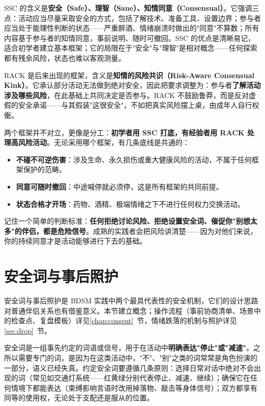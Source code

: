 \documentclass[12pt,UTF8]{ctexbook}
\newcommand{\keyword}[1]{\textbf{#1}}
\begin{document}
SSC 的含义是\keyword{安全（Safe）、理智（Sane）、知情同意（Consensual）}。它强调三点：活动应当尽量采取安全的方式，包括了解技术、准备工具、设置边界；参与者应当处于能理性判断的状态——严重醉酒、情绪崩溃时做出的"同意"不算数；所有内容基于参与者的知情同意，事前说明、随时可撤回。SSC 的优点是清晰易记，适合初学者建立基本框架；它的局限在于"安全"与"理智"是相对概念——任何探索都有残余风险，状态也难以客观测量。

RACK 是后来出现的框架，含义是\keyword{知情的风险共识（Risk-Aware Consensual Kink）}。它承认部分活动无法做到绝对安全，因此把要求调整为：参与者\keyword{了解活动涉及哪些风险}，在此基础上共同决定是否参与。RACK 不鼓励鲁莽，而是反对虚假的安全承诺——与其假装"这很安全"，不如把真实风险摆上桌，由成年人自行权衡。

两个框架并不对立，更像是分工：\keyword{初学者用 SSC 打底，有经验者用 RACK 处理高风险活动}。无论采用哪个框架，有几条底线是共通的：

\begin{itemize}
  \item \keyword{不碰不可逆伤害}：涉及生命、永久损伤或重大健康风险的活动，不属于任何框架保护的范畴。
  \item \keyword{同意可随时撤回}：中途喊停就必须停，这是所有框架的共同前提。
  \item \keyword{状态合格才开场}：药物、酒精、极端情绪之下不进行任何权力交换活动。
\end{itemize}

\begin{tcolorbox}[colback=pink!5!white,colframe=red!50!black,title=贴心小叮咛]
记住一个简单的判断标准：\keyword{任何拒绝讨论风险、拒绝设置安全词、催促你"别想太多"的伴侣，都是危险信号}。成熟的实践者会把风险讲清楚——因为对他们来说，你的持续同意才是活动能够进行下去的基础。
\end{tcolorbox}
\section{安全词与事后照护}\label{sec:aftercare}

安全词与事后照护是 BDSM 实践中两个最具代表性的安全机制，它们的设计思路对普通伴侣关系也有借鉴意义。本节建立概念；操作流程（事前协商清单、场景中的检查点、复盘模板）详见\ref{chap:consent}~节，情绪跌落的机制与照护详见\ref{sec:drop}~节。

安全词是一组事先约定的词语或信号，用于在活动中\keyword{明确表达"停止"或"减速"}。之所以需要专门的词，是因为在这类活动中，"不"、"别"之类的词常常是角色扮演的一部分，语义已经失真。约定安全词要遵循几条原则：选择日常对话中绝对不会出现的词（常见如交通灯系统——红黄绿分别代表停止、减速、继续）；确保它在任何情境下都能表达（束缚影响言语时改用掉落物、敲击等身体信号）；双方都享有同等的使用权，无论处于支配还是服从的位置。
\end{document}
